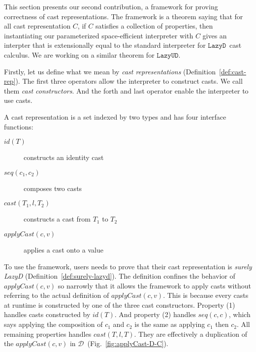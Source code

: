 \documentclass[acmsmall,review,anonymous]{acmart}\settopmatter{printfolios=true,printccs=false,printacmref=false}
\newcommand{\lazyUD}{$\mathtt{Lazy UD}$}
\newcommand{\lazyD}{$\mathtt{Lazy D}$}
\newcommand{\ineffCEKD}{$ \mathcal{D} $}
\begin{document}
This section presents our second contribution, a framework for proving 
correctness of cast representations. The framework is a theorem saying that for 
all cast representation $ C $, if $ C $ satisfies a collection of properties, 
then instantiating our parameterized space-efficient interpreter with $ C $ 
gives an interpter that is extensionally equal to the standard interpreter for 
\lazyD\ cast calculus. We are working on a similar theorem for \lazyUD{}.

Firstly, let us define what we mean by \emph{cast representations} 
(Definition~\ref{def:cast-rep}). The first three operators allow the 
interpreter to construct casts. We call them \textit{cast constructors}. 
And the forth and last operator enable the interpreter to use casts.

\begin{definition}
	\label{def:cast-rep}
	A cast representation is a set indexed by two types and has four interface 
	functions:
	\begin{description}
		\item[$ id(T) $] constructs an identity cast
		\item[$ seq(c_1,c_2) $] composes two casts
		\item[$ cast(T_1,l,T_2) $] constructs a cast from $ T_1 $ to $ T_2 $
		\item[$ applyCast(c,v) $] applies a cast onto a value
	\end{description}
\end{definition}

To use the framework, users needs to prove that their cast representation is 
\emph{surely LazyD} (Definition~\ref{def:surely-lazyd}).
The definition confines the behavior of $ applyCast(c,v) $ so narrowly that it 
allows the framework to apply casts without referring to the actual definition 
of $ applyCast(c,v) $. This 
is because every casts at runtime is constructed by one of 
the three cast constructors. 
Property (1) handles casts constructed by $ id(T) $. 
And property (2) handles $ seq(c,c) $, which says applying the 
composition of $ c_1 $ and $ c_2 $ is the same as applying $ c_1 $ then $ c_2 $.
All remaining properties handles $ cast(T,l,T) $. They are effectively a 
duplication of the $ applyCast(c,v) $ in \ineffCEKD\ 
(Fig.~\ref{fig:applyCast-D-C}).
\end{document}
